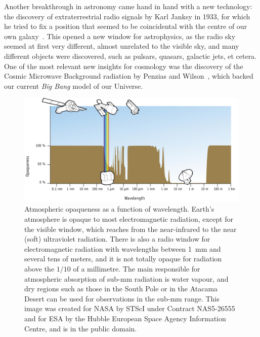 	 Another breakthrough in astronomy came hand in hand with a new
	technology: the discovery of extraterrestrial radio signals by
	Karl Janksy in 1933, for which he tried to fix a position that
	seemed to be coincidental with the centre of our own
	galaxy~\cite{Jansky:1933db, Jansky:1935lq}. This opened a new
	window for astrophysics, as the radio sky seemed at first very
	different, almost unrelated to the visible sky, and many
	different objects were discovered, such as pulsars, quasars,
	galactic jets, et cetera. One of the most relevant new insights
	for cosmology was the discovery of the Cosmic Microwave
	Background radiation by Penzias and
	Wilson~\cite{1979Sci...205..866W, 1979Sci...205..549P}, which
	backed our current \emph{Big Bang} model of our Universe.

\begin{figure}[tbp]
	\centering
		\includegraphics[width=\columnwidth]
		{fig/AtmosphericOpaquenessVsWavelength.png}
	\caption[Atmospheric opaqueness versus wavelength.]
	{
		Atmospheric opaqueness as a function of wavelength. Earth's
		atmosphere is opaque to most electromagnetic radiation,
		except for the visible window, which reaches from the
		near-infrared to the near (soft) ultraviolet radiation.
		There is also a radio window for electromagnetic radiation
		with wavelengths between 1~mm and several tens of meters,
		and it is not totally opaque for radiation above the $1/10$
		of a millimetre. The main responsible for atmospheric
		absorption of sub-mm radiation is water vapour, and dry
		regions such as those in the South Pole or in the Atacama
		Desert can be used for observations in the sub-mm range.
		This image was created for NASA by STScI under Contract
		NAS5-26555 and for ESA by the Hubble European Space Agency
		Information Centre, and is in the public domain.
	}
	\label{fig:fig_AtmosphericOpaquenessVsWavelength}
\end{figure}

